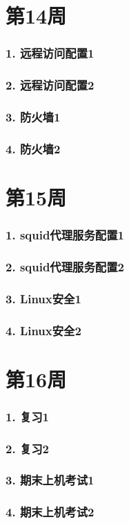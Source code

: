 \documentclass[bigger]{beamer}
\begin{document}
\section{第14周}
\label{sec-14}
\begin{frame}
\frametitle{1. 远程访问配置1}
\label{sec-14-1}
\end{frame}
\begin{frame}
\frametitle{2. 远程访问配置2}
\label{sec-14-2}
\end{frame}
\begin{frame}
\frametitle{3. 防火墙1}
\label{sec-14-3}
\end{frame}
\begin{frame}
\frametitle{4. 防火墙2}
\label{sec-14-4}
\end{frame}
\section{第15周}
\label{sec-15}
\begin{frame}
\frametitle{1. squid代理服务配置1}
\label{sec-15-1}
\end{frame}
\begin{frame}
\frametitle{2. squid代理服务配置2}
\label{sec-15-2}
\end{frame}
\begin{frame}
\frametitle{3. Linux安全1}
\label{sec-15-3}
\end{frame}
\begin{frame}
\frametitle{4. Linux安全2}
\label{sec-15-4}
\end{frame}
\section{第16周}
\label{sec-16}
\begin{frame}
\frametitle{1. 复习1}
\label{sec-16-1}
\end{frame}
\begin{frame}
\frametitle{2. 复习2}
\label{sec-16-2}
\end{frame}
\begin{frame}
\frametitle{3. 期末上机考试1}
\label{sec-16-3}
\end{frame}
\begin{frame}
\frametitle{4. 期末上机考试2}
\label{sec-16-4}
\end{frame}
\end{document}
